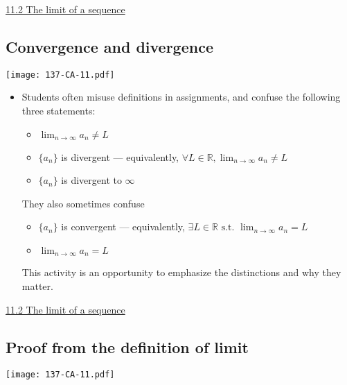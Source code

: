 \documentclass[11pt]{article}
\newcommand {\DS} [1] {${\displaystyle #1}$}
\newcommand{\R}{\mathbb{R}}
\newcommand{\nl}{\hfill \vspace{-1.1\baselineskip}} %
\newcommand{\vii}{\hspace{8mm} \href{https://www.youtube.com/watch?v=Dr8LzBA-H84&list=PLlwePzQY_wW_yFyXauToZNFNhhufzioP2&index=2}{11.2 The limit of a sequence}}
\begin{document}
\begin{videos}
\vii
\end{videos}

\newpage
\subsection{Convergence and divergence}

\begin{center}
{ \texttt{[image: 137-CA-11.pdf]}} 
\end{center}

\begin{comments}
\nl
	\begin{itemize}
		\item    Students often misuse definitions in assignments, and confuse the following three statements:
			\begin{itemize}
				\item  \DS{\lim_{n \to \infty} a_n \neq L}
				\item  \DS{\{a_n\}} is divergent --- equivalently, \DS{\forall L \in \R, \lim_{n \to \infty} a_n \neq L}
				\item \DS{\{a_n\}} is divergent to $\infty$
			\end{itemize}
		They also sometimes confuse
			\begin{itemize}
				\item  \DS{\{a_n\}} is convergent --- equivalently, \DS{\exists L \in \R \mbox{ s.t. } \lim_{n \to \infty} a_n = L}
				\item \DS{\lim_{n \to \infty} a_n = L}
			\end{itemize}	
		This activity is an opportunity to emphasize the distinctions and why they matter.
	\end{itemize}
\end{comments}

\begin{videos}
\vii
\end{videos}

\newpage
\subsection{Proof from the definition of limit}

\begin{center}
{ \texttt{[image: 137-CA-11.pdf]}} 
\end{center}
\end{document}
